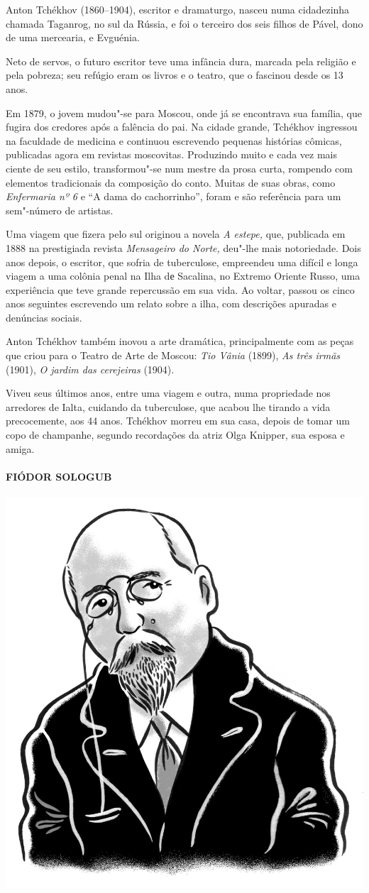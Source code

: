 \noindent{}Anton Tchékhov (1860--1904), escritor e dramaturgo, nasceu numa
cidadezinha chamada Taganrog, no sul da Rússia, e foi o terceiro dos
seis filhos de Pável, dono de uma mercearia, e Evguénia.

Neto de servos, o futuro escritor teve uma infância dura, marcada pela
religião e pela pobreza; seu refúgio eram os livros e o teatro, que o
fascinou desde os 13 anos.

Em 1879, o jovem mudou"-se para Moscou, onde já se encontrava sua
família, que fugira dos credores após a falência do pai. Na cidade
grande, Tchékhov ingressou na faculdade de medicina e continuou
escrevendo pequenas histórias cômicas, publicadas agora em revistas
moscovitas. Produzindo muito e cada vez mais ciente de seu estilo,
transformou"-se num mestre da prosa curta, rompendo com elementos
tradicionais da composição do conto. Muitas de suas obras, como
\emph{Enfermaria nº 6} e ``A dama do cachorrinho'', foram e são
referência para um sem"-número de artistas.

Uma viagem que fizera pelo sul originou a novela \emph{A estepe,}
que, publicada em 1888 na prestigiada revista \emph{Mensageiro do
Norte,} deu"-lhe mais notoriedade. Dois anos depois, o escritor, que
sofria de tuberculose, empreendeu uma difícil e longa viagem a uma
colônia penal na Ilha dе Sacalina, no Extremo Oriente Russo, uma
experiência que teve grande repercussão em sua vida. Ao voltar, passou
os cinco anos seguintes escrevendo um relato sobre a ilha, com
descrições apuradas e denúncias sociais.

Anton Tchékhov também inovou a arte dramática, principalmente com as
peças que criou para o Teatro de Arte de Moscou: \emph{Tio Vânia}
(1899), \emph{As três irmãs} (1901), \emph{O jardim das cerejeiras}
(1904).

Viveu seus últimos anos, entre uma viagem e outra, numa propriedade nos
arredores de Ialta, cuidando da tuberculose, que acabou lhe tirando a
vida precocemente, aos 44 anos. Tchékhov morreu em sua casa, depois de
tomar um copo de champanhe, segundo recordações da atriz Olga Knipper,
sua esposa e amiga.

\paragraph{FIÓDOR SOLOGUB}

\noindent\includegraphics[width=.8in]{./imgs/autor7.jpg}

